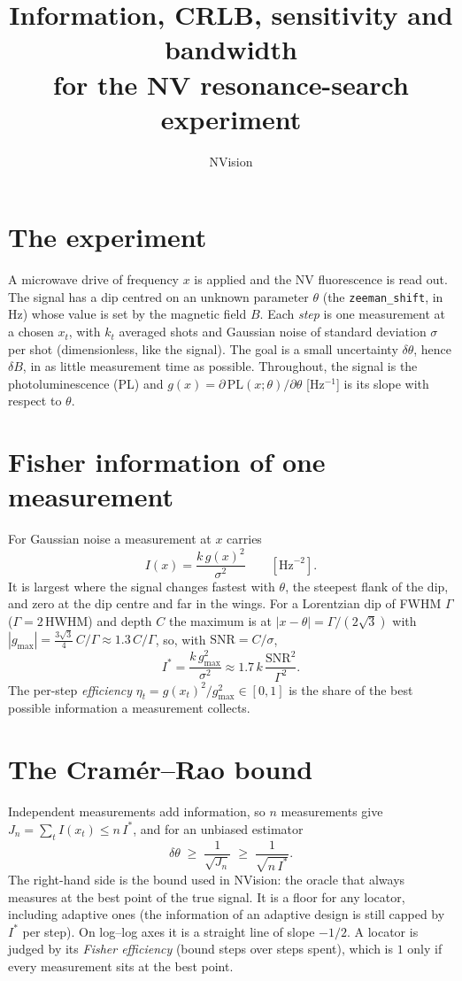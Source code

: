 \documentclass[11pt]{article}
\title{Information, CRLB, sensitivity and bandwidth\\for the NV resonance-search experiment}
\author{NVision}
\date{}
\newcommand{\Istar}{I^{\ast}}
\begin{document}
\maketitle

\section{The experiment}
A microwave drive of frequency $x$ is applied and the NV fluorescence is read out. The signal has a dip centred on an
unknown parameter $\theta$ (the \texttt{zeeman\_shift}, in Hz) whose value is set by the magnetic field $B$. Each
\emph{step} is one measurement at a chosen $x_t$, with $k_t$ averaged shots and Gaussian noise of standard deviation
$\sigma$ per shot (dimensionless, like the signal). The goal is a small uncertainty $\delta\theta$, hence $\delta B$,
in as little measurement time as possible. Throughout, the signal is the photoluminescence (PL) and
$g(x)=\partial\,\mathrm{PL}(x;\theta)/\partial\theta$ [Hz$^{-1}$] is its slope with respect to $\theta$.

\section{Fisher information of one measurement}
For Gaussian noise a measurement at $x$ carries
\begin{equation}
  I(x)=\frac{k\,g(x)^2}{\sigma^2}\qquad[\mathrm{Hz}^{-2}].
\end{equation}
It is largest where the signal changes fastest with $\theta$, the steepest flank of the dip, and zero at the dip
centre and far in the wings. For a Lorentzian dip of FWHM $\Gamma$ ($\Gamma=2\,$HWHM) and depth $C$ the maximum is at
$|x-\theta|=\Gamma/(2\sqrt3)$ with $|g_{\max}|=\tfrac{3\sqrt3}{4}\,C/\Gamma\approx1.3\,C/\Gamma$, so, with
$\mathrm{SNR}=C/\sigma$,
\begin{equation}
  \Istar=\frac{k\,g_{\max}^2}{\sigma^2}\approx1.7\,k\,\frac{\mathrm{SNR}^2}{\Gamma^2}.
\end{equation}
The per-step \emph{efficiency} $\eta_t=g(x_t)^2/g_{\max}^2\in[0,1]$ is the share of the best possible information a
measurement collects.

\section{The Cram\'er--Rao bound}
Independent measurements add information, so $n$ measurements give $J_n=\sum_t I(x_t)\le n\,\Istar$, and for an
unbiased estimator
\begin{equation}
  \delta\theta\;\ge\;\frac{1}{\sqrt{J_n}}\;\ge\;\frac{1}{\sqrt{n\,\Istar}}.
\end{equation}
The right-hand side is the bound used in NVision: the oracle that always measures at the best point of the true
signal. It is a floor for any locator, including adaptive ones (the information of an adaptive design is still capped
by $\Istar$ per step). On log--log axes it is a straight line of slope $-1/2$. A locator is judged by its
\emph{Fisher efficiency} (bound steps over steps spent), which is $1$ only if every measurement sits at the best point.
\end{document}
